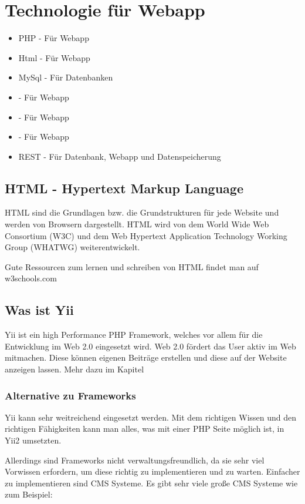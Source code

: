 \newpage	
\def \currentAuthor {Florian Tipotsch}
	\section{Technologie für Webapp}
\begin{itemize}
	\item PHP - Für Webapp
	\item Html - Für Webapp 	
	\item MySql - Für Datenbanken
	\item {} - Für Webapp
	\item {} - Für Webapp
	\item {} - Für Webapp
	\item REST - Für Datenbank, Webapp und Datenspeicherung
\end{itemize}
	\subsection{HTML - Hypertext Markup Language}
	HTML sind die Grundlagen bzw. die Grundstrukturen für jede Website und werden von Browsern dargestellt. HTML wird von dem World Wide Web Consortium (W3C) \cite{W3C} und dem Web Hypertext Application Technology Working Group (WHATWG) \cite{WHATWG} weiterentwickelt.
	
	Gute Ressourcen zum lernen und schreiben von HTML findet man auf w3schools.com \cite {W3schools}
	
	\subsection{Was ist Yii}
	Yii ist ein high Performance PHP Framework, welches vor allem für die Entwicklung im Web 2.0 eingesetzt wird. Web 2.0 fördert das User aktiv im Web mitmachen. Diese können eigenen Beiträge erstellen und diese auf der Website anzeigen lassen. Mehr dazu im Kapitel  \cite{Web_2}

	\subsubsection{Alternative zu Frameworks}
	Yii kann sehr weitreichend eingesetzt werden. Mit dem richtigen Wissen und den richtigen Fähigkeiten kann man alles, was mit einer PHP Seite möglich ist, in Yii2 umsetzten.

Allerdings sind Frameworks nicht verwaltungsfreundlich, da sie sehr viel Vorwissen erfordern, um diese richtig zu implementieren und zu warten. Einfacher zu implementieren sind CMS Systeme. Es gibt sehr viele große CMS Systeme wie zum Beispiel:

